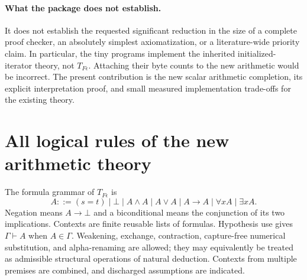 \documentclass[11pt,letterpaper]{article}
\theoremstyle{definition}\newtheorem{definition}[theorem]{Definition}
\theoremstyle{remark}\newtheorem{remark}[theorem]{Remark}
\newcommand{\TF}{T_{F\epsilon}}
\begin{document}
\paragraph{What the package does not establish.}
It does not establish the requested significant reduction in the size
of a complete proof checker, an absolutely simplest axiomatization,
or a literature-wide priority claim. In particular, the tiny programs
implement the inherited initialized-iterator theory, not $\TF$.
Attaching their byte counts to the new arithmetic would be incorrect.
The present contribution is the new scalar arithmetic completion,
its explicit interpretation proof, and small measured implementation
trade-offs for the existing theory.

\section{All logical rules of the new arithmetic theory}
\label{sec:new-logic}
The formula grammar of $\TF$ is
\[
A::=(s=t)\mid\bot\mid A\land A\mid A\lor A\mid A\to A
       \mid\forall x A\mid\exists x A.
\]
Negation means $A\to\bot$ and a biconditional means the conjunction of
its two implications. Contexts are finite reusable lists of formulas.
Hypothesis use gives $\Gamma\vdash A$ when $A\in\Gamma$. Weakening,
exchange, contraction, capture-free numerical substitution, and
alpha-renaming are allowed; they may equivalently be treated as
admissible structural operations of natural deduction. Contexts from
multiple premises are combined, and discharged assumptions are indicated.
\end{document}
